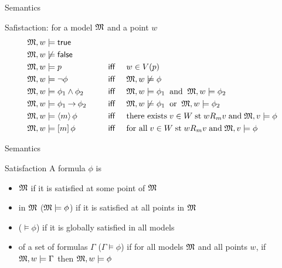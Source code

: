\documentclass{beamer}
\begin{document}
\begin{slide}{Semantics}\label{s:13}
\small
\begin{block}{Safistaction: for a model $\mathfrak{M}$ and a point $w$}
\begin{align*}
\mathfrak{M}, w & \models \mathsf{true} &&\\
\mathfrak{M}, w & \not \models  \mathsf{false} &&\\
\mathfrak{M}, w & \models  p &  \text{~~~ \textsf{iff} ~~~}  & w \in V(p)\\
\mathfrak{M}, w  & \models \neg \phi  & \text{~~~ \textsf{iff} ~~~} & \mathfrak{M}, w  \not \models \phi \\
\mathfrak{M}, w & \models \phi_1 \mathbin{\wedge} \phi_2  &\text{~~~ \textsf{iff} ~~~} & \mathfrak{M}, w \models  \phi_1 \;\; \text{and}\;\;
                                                   \mathfrak{M}, w \models  \phi_2 \\
\mathfrak{M}, w & \models \phi_1 \mathbin{\rightarrow} \phi_2 & \text{~~~ \textsf{iff} ~~~} & \mathfrak{M}, w \not \models \phi_1  \;\; \text{or}\;\; 
                                                  \mathfrak{M}, w \models \phi_2 \\
\mathfrak{M}, w  &\models \langle m \rangle\, \phi & \text{ ~~~ \textsf{iff} ~~~} &
\text{there exists}\; v \in W \;\text{st}\; w R_m v\; \text{and}\; \mathfrak{M}, v \models \phi\\
\mathfrak{M}, w & \models [m]\, \phi & \text{~~~ \textsf{iff} ~~~} &
\text{for all}\; v \in W \; \text{st}\; w R_m v\; \text{and}\; \mathfrak{M}, v \models \phi\\
\end{align*}
\end{block}
\end{slide}


\begin{slide}{Semantics}\label{s:14}
\small
\begin{block}{Satisfaction}
A formula $\phi$ is
\begin{itemize}
\item {}  $\mathfrak{M}$ if it is satisfied at some point of $\mathfrak{M}$
\item {} in $\mathfrak{M}$ ($\mathfrak{M} \models \phi$) if it is satisfied at all points in $\mathfrak{M}$
\item {} ($\models \phi$) if it is globally satisfied in all models
\item {} of a set of formulas $\Gamma$ ($\Gamma \models \phi$) if for all models $\mathfrak{M}$ and all
points $w$, if $\mathfrak{M}, w \models \Gamma$ then $\mathfrak{M}, w \models \phi$
\end{itemize}
\end{block}
\end{slide}
\end{document}
